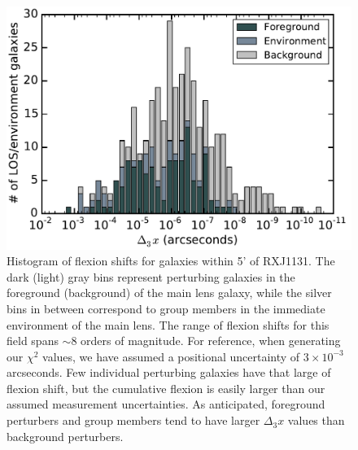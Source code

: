 \documentclass{emulateapj}
\begin{document}
\begin{figure}[!h]
\begin{center}
\includegraphics[width=1\columnwidth]{RXJ1131_dx3_hist.pdf}
\caption{\label{fig:d3xhist} Histogram of flexion shifts for galaxies within 5' of RXJ1131.  The dark (light) gray bins represent perturbing galaxies in the foreground (background) of the main lens galaxy, while the silver bins in between correspond to group members in the immediate environment of the main lens. The range of flexion shifts for this field spans $\sim 8$ orders of magnitude. For reference, when generating our $\chi^2$ values, we have assumed a positional uncertainty of $3 \times 10^{-3}$ arcseconds. Few individual perturbing galaxies have that large of flexion shift, but the cumulative flexion is easily larger than our assumed measurement uncertainties. As anticipated, foreground perturbers and group members tend to have larger $\Delta_3 x$ values than background perturbers.%
}
\end{center}
\end{figure}
\end{document}
